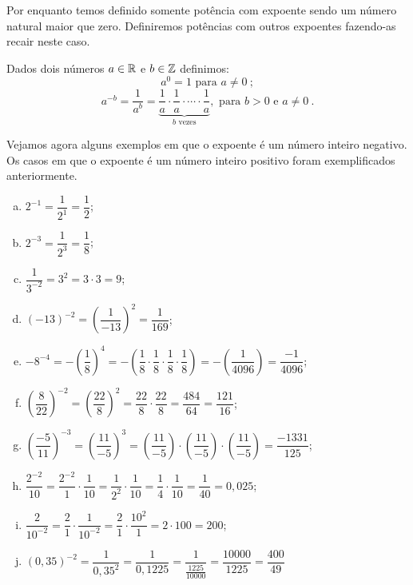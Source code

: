  Por enquanto temos definido somente potência com expoente sendo um número natural maior que zero. Definiremos potências com outros expoentes fazendo-as recair neste caso.

\begin{obs}
Dados dois números $a \in \mathbb{R}$ e $b \in \mathbb{Z}$ definimos:
\begin{equation*}
a^{0}= 1 \text{ para } a \neq 0 \ ;
\end{equation*}
\begin{equation*}
a^{-b}= \dfrac{1}{a^b}= \underbrace{\dfrac{1}{a} \cdot \dfrac{1}{a} \cdot \cdots \cdot \dfrac{1}{a}}_{b \text{ vezes}}, \text{ para } b>0 \text{ e } a \neq 0 \ .
\end{equation*}
\end{obs}

 \begin{exem}
 Vejamos agora alguns exemplos em que o expoente é um número inteiro negativo. Os casos em que o expoente é um número inteiro positivo foram exemplificados anteriormente.

 \begin{enumerate}[a)]
  \item $2^{-1}= \dfrac{1}{2^{1}}= \dfrac{1}{2}$;
  \item $2^{-3}= \dfrac{1}{2^3}= \dfrac{1}{8}$;
  \item $\dfrac{1}{3^{-2}}= 3^2= 3 \cdot 3= 9$;
  \item $(-13)^{-2}= \left( \dfrac{1}{-13} \right)^{2}= \dfrac{1}{169}$;
  \item $-8^{-4}= -\left( \dfrac{1}{8} \right)^{4}= -\left( \dfrac{1}{8} \cdot \dfrac{1}{8} \cdot \dfrac{1}{8} \cdot \dfrac{1}{8} \right)= -\left( \dfrac{1}{4096} \right)= \dfrac{-1}{4096}$;
  \item $\left( \dfrac{8}{22} \right)^{-2}= \left( \dfrac{22}{8} \right)^{2}= \dfrac{22}{8} \cdot \dfrac{22}{8}= \dfrac{484}{64}= \dfrac{121}{16}$;
  \item $\left( \dfrac{-5}{11} \right)^{-3}= \left( \dfrac{11}{-5} \right)^{3}= \left( \dfrac{11}{-5} \right) \cdot \left( \dfrac{11}{-5} \right) \cdot \left( \dfrac{11}{-5} \right)= \dfrac{-1331}{125}$;
  \item $\dfrac{2^{-2}}{10}= \dfrac{2^{-2}}{1} \cdot \dfrac{1}{10}= \dfrac{1}{2^{2}} \cdot \dfrac{1}{10}= \dfrac{1}{4} \cdot \dfrac{1}{10}= \dfrac{1}{40}= 0,025$;
  \item $\dfrac{2}{10^{-2}}= \dfrac{2}{1} \cdot \dfrac{1}{10^{-2}}= \dfrac{2}{1} \cdot \dfrac{10^{2}}{1}= 2 \cdot 100= 200$;
  \item $(0,35)^{-2}= \dfrac{1}{0,35^{2}}= \dfrac{1}{0,1225}= \dfrac{1}{\frac{1225}{10000}}= \dfrac{10000}{1225}= \dfrac{400}{49}$
 \end{enumerate}

 \end{exem}

